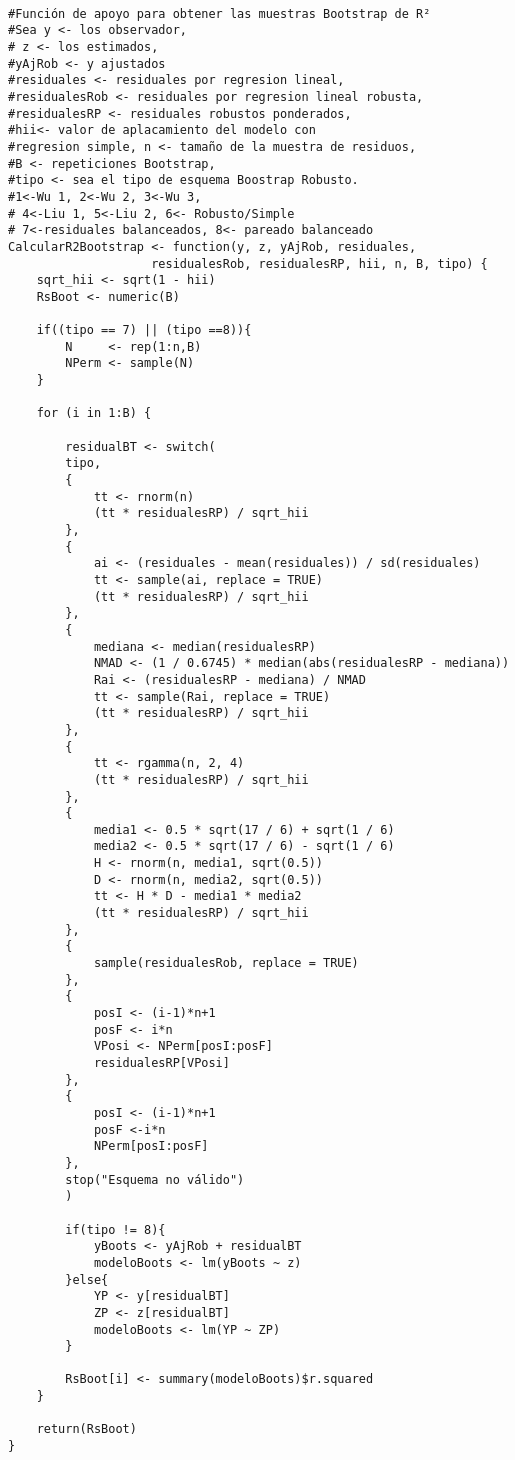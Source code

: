 \begin{verbatim}

#Función de apoyo para obtener las muestras Bootstrap de R²
#Sea y <- los observador,
# z <- los estimados,
#yAjRob <- y ajustados 
#residuales <- residuales por regresion lineal,
#residualesRob <- residuales por regresion lineal robusta, 
#residualesRP <- residuales robustos ponderados,
#hii<- valor de aplacamiento del modelo con 
#regresion simple, n <- tamaño de la muestra de residuos, 
#B <- repeticiones Bootstrap,
#tipo <- sea el tipo de esquema Boostrap Robusto. 
#1<-Wu 1, 2<-Wu 2, 3<-Wu 3,
# 4<-Liu 1, 5<-Liu 2, 6<- Robusto/Simple
# 7<-residuales balanceados, 8<- pareado balanceado
CalcularR2Bootstrap <- function(y, z, yAjRob, residuales, 
					residualesRob, residualesRP, hii, n, B, tipo) {
	sqrt_hii <- sqrt(1 - hii)
	RsBoot <- numeric(B)
	
	if((tipo == 7) || (tipo ==8)){
		N     <- rep(1:n,B)
		NPerm <- sample(N)
	}
	
	for (i in 1:B) {
		
		residualBT <- switch(
		tipo,
		{
			tt <- rnorm(n)
			(tt * residualesRP) / sqrt_hii
		},
		{
			ai <- (residuales - mean(residuales)) / sd(residuales)
			tt <- sample(ai, replace = TRUE)
			(tt * residualesRP) / sqrt_hii
		},
		{
			mediana <- median(residualesRP)
			NMAD <- (1 / 0.6745) * median(abs(residualesRP - mediana))
			Rai <- (residualesRP - mediana) / NMAD
			tt <- sample(Rai, replace = TRUE)
			(tt * residualesRP) / sqrt_hii
		},
		{
			tt <- rgamma(n, 2, 4)
			(tt * residualesRP) / sqrt_hii
		},
		{
			media1 <- 0.5 * sqrt(17 / 6) + sqrt(1 / 6)
			media2 <- 0.5 * sqrt(17 / 6) - sqrt(1 / 6)
			H <- rnorm(n, media1, sqrt(0.5))
			D <- rnorm(n, media2, sqrt(0.5))
			tt <- H * D - media1 * media2
			(tt * residualesRP) / sqrt_hii
		},
		{
			sample(residualesRob, replace = TRUE)
		},
		{
			posI <- (i-1)*n+1
			posF <- i*n
			VPosi <- NPerm[posI:posF]
			residualesRP[VPosi]
		},
		{
			posI <- (i-1)*n+1
			posF <-i*n
			NPerm[posI:posF]
		},
		stop("Esquema no válido")
		)
		
		if(tipo != 8){
			yBoots <- yAjRob + residualBT
			modeloBoots <- lm(yBoots ~ z)
		}else{
			YP <- y[residualBT]
			ZP <- z[residualBT]
			modeloBoots <- lm(YP ~ ZP)
		}
		
		RsBoot[i] <- summary(modeloBoots)$r.squared
	}
	
	return(RsBoot)
}
\end{verbatim}


